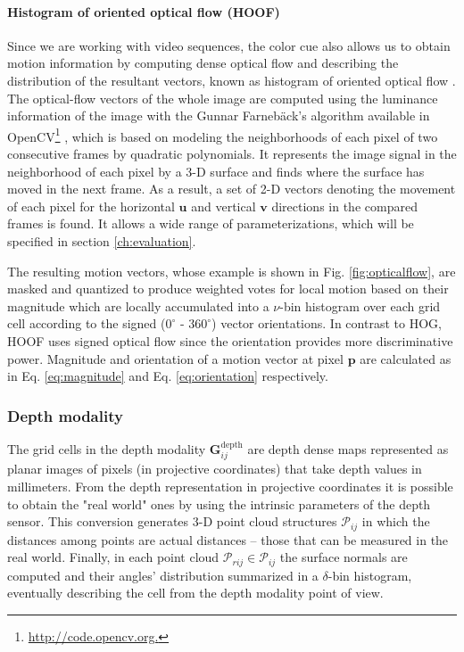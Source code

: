 \documentclass[10pt,twocolumn,letterpaper]{article}
\begin{document}
\paragraph{Histogram of oriented optical flow (HOOF)} 
Since we are working with video sequences, the color cue also allows us to obtain motion information by computing dense optical flow and describing the distribution of the resultant vectors, known as histogram of oriented optical flow \cite{dalal2006human}. The optical-flow vectors of the whole image are computed using the luminance information of the image with the Gunnar Farneb\"{a}ck's algorithm \cite{farneback2003two} available in OpenCV\footnote{\url{http://code.opencv.org.}} \cite{bradski2008learning}, which is based on modeling the neighborhoods of each pixel of two consecutive frames by quadratic polynomials. It represents the image signal in the neighborhood of each pixel by a 3-D surface and finds where the surface has moved in the next frame. As a result, a set of 2-D vectors denoting the movement of each pixel for the horizontal $\mathbf{u}$ and vertical $\mathbf{v}$ directions in the compared frames is found. It allows a wide range of parameterizations, which will be specified in section \ref{ch:evaluation}.

 The resulting motion vectors, whose example is shown in Fig. \ref{fig:opticalflow}, are masked and quantized to produce weighted votes for local motion based on their magnitude which are locally accumulated into a $\nu$-bin histogram over each grid cell according to the signed ($0^\circ$ - $360^\circ$) vector orientations. In contrast to HOG, HOOF uses signed optical flow since the orientation provides more discriminative power. Magnitude and orientation of a motion vector at pixel $\mathbf{p}$ are calculated as in Eq. \ref{eq:magnitude} and Eq. \ref{eq:orientation} respectively.

\subsubsection{Depth modality}
\label{sssec:depth}

The grid cells in the depth modality $\mathbf{G}_{ij}^\mathrm{depth}$ are depth dense maps represented as planar images of pixels (in projective coordinates) that take depth values in millimeters. From the depth representation in projective coordinates it is possible to obtain the "real world" ones by using the intrinsic parameters of the depth sensor. This conversion generates 3-D point cloud structures $\mathcal{P}_{ij}$ in which the distances among points are actual distances -- those that can be measured in the real world. Finally, in each point cloud $\mathcal{P}_{rij} \in \mathcal{P}_{ij}$ the surface normals are computed and their angles' distribution summarized in a $\delta$-bin histogram, eventually describing the cell from the depth modality point of view.
\end{document}
